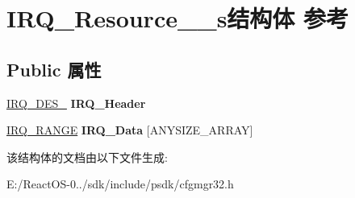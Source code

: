 \hypertarget{struct_i_r_q___resource__64__s}{}\section{I\+R\+Q\+\_\+\+Resource\+\_\+\_\+s结构体 参考}
\label{struct_i_r_q___resource__64__s}
\subsection*{Public 属性}
\begin{DoxyCompactItemize}
\item 
\mbox{\label{struct_i_r_q___resource__64__s_aab087d3ba023deece593b9bf40186ab0}} 
\hyperlink{struct_i_r_q___des__64__s}{I\+R\+Q\+\_\+\+D\+E\+S\+\_} {\bfseries I\+R\+Q\+\_\+\+Header}
\item 
\mbox{\label{struct_i_r_q___resource__64__s_ae91e3beb5ba85046bb7a44ace42364d7}} 
\hyperlink{struct_i_r_q___range__s}{I\+R\+Q\+\_\+\+R\+A\+N\+GE} {\bfseries I\+R\+Q\+\_\+\+Data} \mbox{[}A\+N\+Y\+S\+I\+Z\+E\+\_\+\+A\+R\+R\+AY\mbox{]}
\end{DoxyCompactItemize}


该结构体的文档由以下文件生成\+:\begin{DoxyCompactItemize}
\item 
E\+:/\+React\+O\+S-\/0../sdk/include/psdk/cfgmgr32.\+h\end{DoxyCompactItemize}
